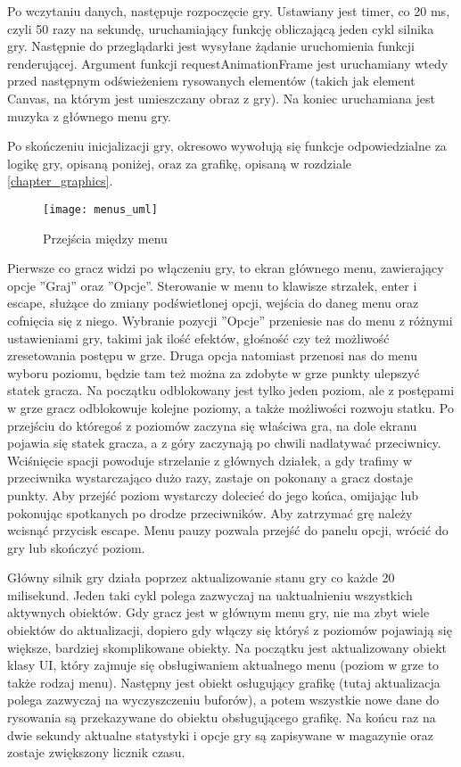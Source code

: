 Po wczytaniu danych, następuje rozpoczęcie gry. Ustawiany jest timer, co 20 ms, czyli 50 razy na sekundę, uruchamiający funkcję obliczającą jeden cykl silnika gry. Następnie do przeglądarki jest wysyłane żądanie uruchomienia funkcji renderującej. Argument funkcji requestAnimationFrame jest uruchamiany wtedy przed następnym od\'swieżeniem rysowanych elementów (takich jak element Canvas, na którym jest umieszczany obraz z gry). Na koniec uruchamiana jest muzyka z głównego menu gry.

Po skończeniu inicjalizacji gry, okresowo wywołują się funkcje odpowiedzialne za logikę gry, opisaną poniżej, oraz za grafikę, opisaną w rozdziale \ref{chapter_graphics}.
\newpage

\smallskip

\begin{wrapfigure}{r}{0.39\textwidth}
	\centering
	\noindent\texttt{[image: menus\_uml]}
	\caption{Przej\'scia między menu}
\end{wrapfigure}
Pierwsze co gracz widzi po włączeniu gry, to ekran głównego menu, zawierający opcje ''Graj'' oraz ''Opcje''. Sterowanie w menu to klawisze strzałek, enter i escape, służące do zmiany pod\'swietlonej opcji, wej\'scia do daneg menu oraz cofnięcia się z niego. Wybranie pozycji ''Opcje'' przeniesie nas do menu z różnymi ustawieniami gry, takimi jak ilo\'sć efektów, gło\'sno\'sć czy też możliwo\'sć zresetowania postępu w grze. Druga opcja natomiast przenosi nas do menu wyboru poziomu, będzie tam też można za zdobyte w grze punkty ulepszyć statek gracza. Na początku odblokowany jest tylko jeden poziom, ale z postępami w grze gracz odblokowuje kolejne poziomy, a także możliwo\'sci rozwoju statku. Po przej\'sciu do którego\'s z poziomów zaczyna się wła\'sciwa gra, na dole ekranu pojawia się statek gracza, a z góry zaczynają po chwili nadlatywać przeciwnicy. Wci\'snięcie spacji powoduje strzelanie z głównych działek, a gdy trafimy w przeciwnika wystarczająco dużo razy, zastaje on pokonany a gracz dostaje punkty. Aby przej\'sć poziom wystarczy dolecieć do jego końca, omijając lub pokonując spotkanych po drodze przeciwników. Aby zatrzymać grę należy wcisnąć przycisk escape. Menu pauzy pozwala przej\'sć do panelu opcji, wrócić do gry lub skończyć poziom.\bigskip

\smallskip

Główny silnik gry działa poprzez aktualizowanie stanu gry co każde 20 milisekund. Jeden taki cykl polega zazwyczaj na uaktualnieniu wszystkich aktywnych obiektów. Gdy gracz jest w głównym menu gry, nie ma zbyt wiele obiektów do aktualizacji, dopiero gdy włączy się który\'s z poziomów pojawiają się większe, bardziej skomplikowane obiekty. Na początku jest aktualizowany obiekt klasy UI, który zajmuje się obsługiwaniem aktualnego menu (poziom w grze to także rodzaj menu). Następny jest obiekt osługujący grafikę (tutaj aktualizacja polega zazwyczaj na wyczyszczeniu buforów), a potem wszystkie nowe dane do rysowania są przekazywane do obiektu obsługującego grafikę. Na końcu raz na dwie sekundy aktualne statystyki i opcje gry są zapisywane w magazynie oraz zostaje zwiększony licznik czasu.

